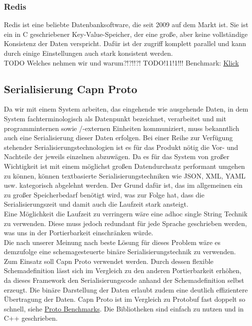 \subsubsection{Redis}
Redis ist eine beliebte Datenbanksoftware, die seit 2009 auf dem Markt ist. Sie ist ein in C geschriebener Key-Value-Speicher, der eine große, aber keine vollständige Konsistenz der Daten verspricht. Dafür ist der zugriff komplett parallel und kann durch einige Einstellungen auch stark konsistent werden.
\\
TODO Welches nehmen wir und warum?!?!!?! TODO!11!1!!!
Benchmark:  \href{https://wiki.volution.ro/Dehems/Benchmarks/Results}{Klick}
\subsection{Serialisierung Capn Proto}
Da wir mit einem System arbeiten, das eingehende wie ausgehende Daten, in dem System fachterminologisch als Datenpunkt bezeichnet, verarbeitet und mit programminternen sowie /-externen Einheiten kommuniziert, muss bekanntlich auch eine Serialisierung dieser Daten erfolgen.  Bei einer Reihe zur Verfügung stehender Serialisierungstechnologien ist es für das Produkt nötig die Vor- und Nachteile der jeweils einzelnen abzuwägen. Da es für das System von großer Wichtigkeit ist mit einem möglichst großen Datendurchsatz performant umgehen zu können, können textbasierte Serialisierungstechniken wie JSON, XML, YAML usw. kategorisch abgelehnt werden. Der Grund dafür ist, das im allgemeinen ein zu großer Speicherbedarf benötigt wird, was zur Folge hat, dass die Serialisierungszeit und damit auch die Laufzeit stark ansteigt.\\ 
Eine Möglichkeit die Laufzeit zu verringern wäre eine adhoc single String Technik zu verwenden. Diese muss jedoch redundant für jede Sprache geschrieben werden, was uns in der Portierbarkeit einschränken würde.\\
Die nach unserer Meinung nach beste Lösung für dieses Problem wäre es demzufolge eine schemagesteuerte binäre Serialisierungstechnik zu verwenden. Zum Einsatz soll Capn Proto verwendet werden. Durch dessen flexible Schemadefinition lässt sich im Vergleich zu den anderen Portierbarkeit erhöhen, da dieses Framework den Serialisierungscode anhand der Schemadefinition selbst erzeugt. Die binäre Darstellung der Daten erlaubt zudem eine deutlich effizientere Übertragung der Daten. Capn Proto ist im Vergleich zu Protobuf fast doppelt so schnell, siehe \href{https://github.com/ChrisMacNaughton/proto_benchmarks}{Proto Benchmarks}. Die Bibliotheken sind einfach zu nutzen und in C++ geschrieben.
